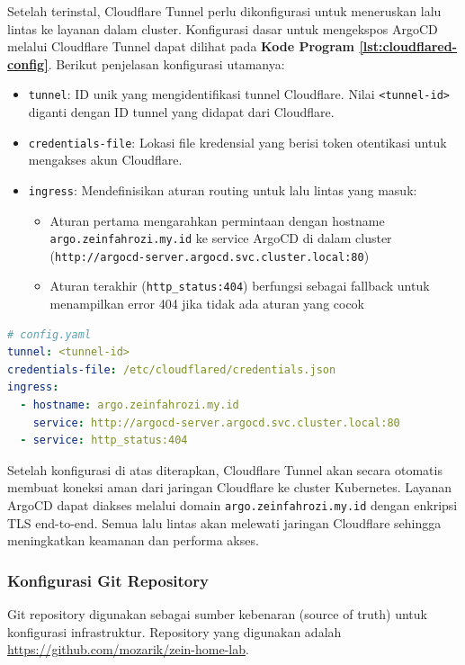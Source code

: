 Setelah terinstal, Cloudflare Tunnel perlu dikonfigurasi untuk meneruskan lalu
lintas ke layanan dalam cluster. Konfigurasi dasar untuk mengekspos ArgoCD
melalui Cloudflare Tunnel dapat dilihat pada \textbf{Kode Program
  \ref{lst:cloudflared-config}}. Berikut penjelasan konfigurasi utamanya:

\begin{itemize}
  \item \texttt{tunnel}: ID unik yang mengidentifikasi tunnel Cloudflare. Nilai \texttt{<tunnel-id>} diganti dengan ID tunnel yang didapat dari Cloudflare.
  \item \texttt{credentials-file}: Lokasi file kredensial yang berisi token otentikasi untuk mengakses akun Cloudflare.
  \item \texttt{ingress}: Mendefinisikan aturan routing untuk lalu lintas yang masuk:
        \begin{itemize}
          \item Aturan pertama mengarahkan permintaan dengan hostname
                \texttt{argo.zeinfahrozi.my.id} ke service ArgoCD di dalam cluster
                (\texttt{http://argocd-server.argocd.svc.cluster.local:80})
          \item Aturan terakhir (\texttt{http\_status:404}) berfungsi sebagai fallback untuk
                menampilkan error 404 jika tidak ada aturan yang cocok
        \end{itemize}
\end{itemize}

\begin{lstlisting}[language=yaml, 
  basicstyle=\footnotesize\ttfamily,
  caption={Konfigurasi dasar Cloudflare Tunnel untuk ArgoCD},
  label={lst:cloudflared-config}]
# config.yaml
tunnel: <tunnel-id>
credentials-file: /etc/cloudflared/credentials.json
ingress:
  - hostname: argo.zeinfahrozi.my.id
    service: http://argocd-server.argocd.svc.cluster.local:80
  - service: http_status:404
\end{lstlisting}

Setelah konfigurasi di atas diterapkan, Cloudflare Tunnel akan secara otomatis
membuat koneksi aman dari jaringan Cloudflare ke cluster Kubernetes. Layanan
ArgoCD dapat diakses melalui domain \texttt{argo.zeinfahrozi.my.id} dengan
enkripsi TLS end-to-end. Semua lalu lintas akan melewati jaringan Cloudflare
sehingga meningkatkan keamanan dan performa akses.

\subsubsection{Konfigurasi Git Repository}
Git repository digunakan sebagai sumber kebenaran (source of truth) untuk
konfigurasi infrastruktur. Repository yang digunakan adalah
\url{https://github.com/mozarik/zein-home-lab}.

